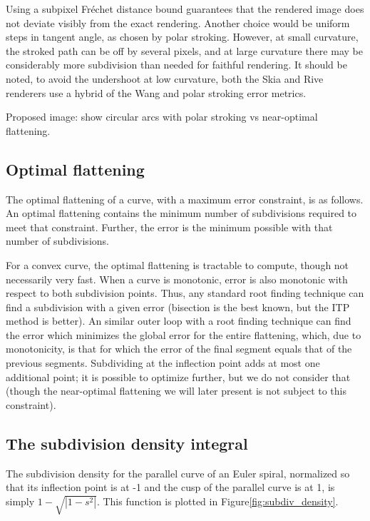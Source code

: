 \documentclass[sigconf, authordraft]{acmart}
\begin{document}
Using a subpixel Fréchet distance bound guarantees that the rendered image does not deviate visibly from the exact rendering. Another choice would be uniform steps in tangent angle, as chosen by polar stroking\cite{Kilgard2020}. However, at small curvature, the stroked path can be off by several pixels, and at large curvature there may be considerably more subdivision than needed for faithful rendering. It should be noted, to avoid the undershoot at low curvature, both the Skia\cite{Skia} and Rive\cite{Rive} renderers use a hybrid of the Wang and polar stroking error metrics.

Proposed image: show circular arcs with polar stroking vs near-optimal flattening.

\subsection{Optimal flattening}

The optimal flattening of a curve, with a maximum error constraint, is as follows. An optimal flattening contains the minimum number of subdivisions required to meet that constraint. Further, the error is the minimum possible with that number of subdivisions.

For a convex curve, the optimal flattening is tractable to compute, though not necessarily very fast. When a curve is monotonic, error is also monotonic with respect to both subdivision points. Thus, any standard root finding technique can find a subdivision with a given error (bisection is the best known, but the ITP method \cite{Oliveira2020} is better). An similar outer loop with a root finding technique can find the error which minimizes the global error for the entire flattening, which, due to monotonicity, is that for which the error of the final segment equals that of the previous segments. Subdividing at the inflection point adds at most one additional point; it is possible to optimize further, but we do not consider that (though the near-optimal flattening we will later present is not subject to this constraint).

\subsection{The subdivision density integral}

The subdivision density for the parallel curve of an Euler spiral, normalized so that its inflection point is at -1 and the cusp of the parallel curve is at 1, is simply $1 - \sqrt{|1-s^2|}$. This function is plotted in Figure\ref{fig:subdiv_density}.
\end{document}

